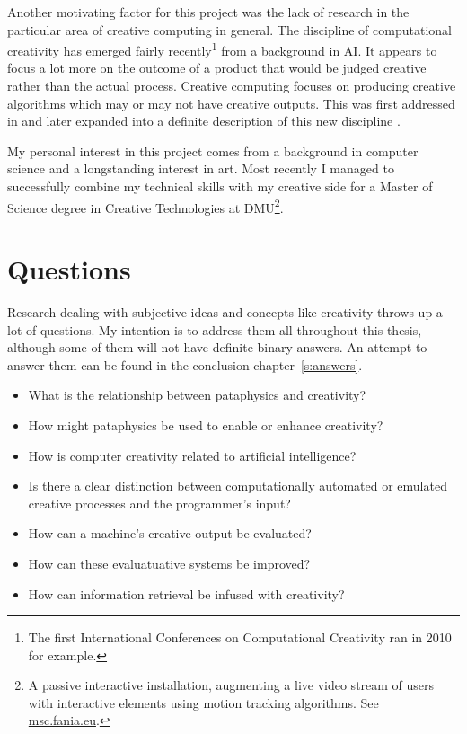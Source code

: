 Another motivating factor for this project was the lack of research in the particular area of creative computing in general. The discipline of computational creativity has emerged fairly recently\footnote{The first International Conferences on Computational Creativity ran in 2010 for example.} from a background in \ac{AI}. It appears to focus a lot more on the outcome of a product that would be judged creative rather than the actual process. Creative computing focuses on producing creative algorithms which may or may not have creative outputs. This was first addressed in \autocite{Raczinski2013} and later expanded into a definite description of this new discipline \autocite{Hugill2013c}.

\spirals

My personal interest in this project comes from a background in computer science and a longstanding interest in art. Most recently I managed to successfully combine my technical skills with my creative side for a Master of Science degree in Creative Technologies at \ac{DMU}\footnote{A passive interactive installation, augmenting a live video stream of users with interactive elements using motion tracking algorithms. See \url{msc.fania.eu}.}. 


\section{Questions}

Research dealing with subjective ideas and concepts like creativity throws up a lot of questions. My intention is to address them all throughout this thesis, although some of them will not have definite binary answers. An attempt to answer them can be found in the conclusion chapter~\ref{s:answers}.

\begin{itemize}
  \item What is the relationship between pataphysics and creativity?
  \item How might pataphysics be used to enable or enhance creativity?
  \item How is computer creativity related to artificial intelligence?
  \item Is there a clear distinction between computationally automated or emulated creative processes and the programmer's input?
  \item How can a machine's creative output be evaluated?
  \item How can these evaluatuative systems be improved?
  \item How can information retrieval be infused with creativity?
\end{itemize}


